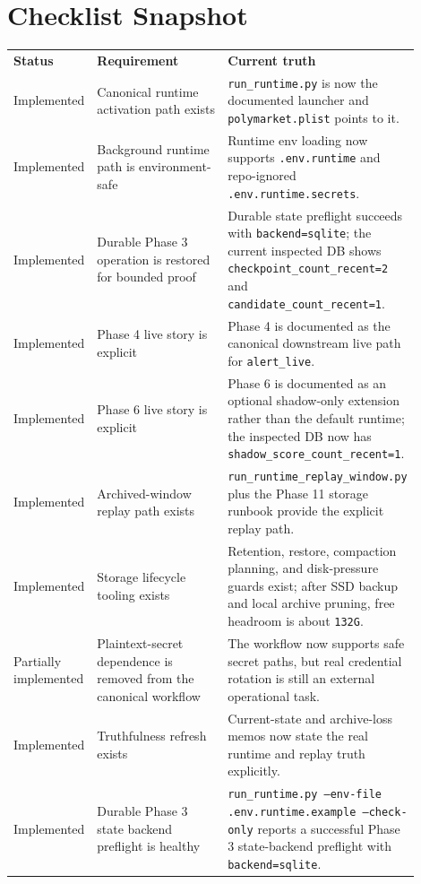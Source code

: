 \documentclass{article}
\begin{document}
\section*{Checklist Snapshot}
\begin{longtable}{p{0.18\linewidth}p{0.52\linewidth}p{0.20\linewidth}}
\textbf{Status} & \textbf{Requirement} & \textbf{Current truth} \\
Implemented & Canonical runtime activation path exists & \texttt{run\_runtime.py} is now the documented launcher and \texttt{polymarket.plist} points to it. \\
Implemented & Background runtime path is environment-safe & Runtime env loading now supports \texttt{.env.runtime} and repo-ignored \texttt{.env.runtime.secrets}. \\
Implemented & Durable Phase 3 operation is restored for bounded proof & Durable state preflight succeeds with \texttt{backend=sqlite}; the current inspected DB shows \texttt{checkpoint\_count\_recent=2} and \texttt{candidate\_count\_recent=1}. \\
Implemented & Phase 4 live story is explicit & Phase 4 is documented as the canonical downstream live path for \texttt{alert\_live}. \\
Implemented & Phase 6 live story is explicit & Phase 6 is documented as an optional shadow-only extension rather than the default runtime; the inspected DB now has \texttt{shadow\_score\_count\_recent=1}. \\
Implemented & Archived-window replay path exists & \texttt{run\_runtime\_replay\_window.py} plus the Phase 11 storage runbook provide the explicit replay path. \\
Implemented & Storage lifecycle tooling exists & Retention, restore, compaction planning, and disk-pressure guards exist; after SSD backup and local archive pruning, free headroom is about \texttt{132G}. \\
Partially implemented & Plaintext-secret dependence is removed from the canonical workflow & The workflow now supports safe secret paths, but real credential rotation is still an external operational task. \\
Implemented & Truthfulness refresh exists & Current-state and archive-loss memos now state the real runtime and replay truth explicitly. \\
Implemented & Durable Phase 3 state backend preflight is healthy & \texttt{run\_runtime.py --env-file .env.runtime.example --check-only} reports a successful Phase 3 state-backend preflight with \texttt{backend=sqlite}. \\

\end{longtable}
\end{document}
